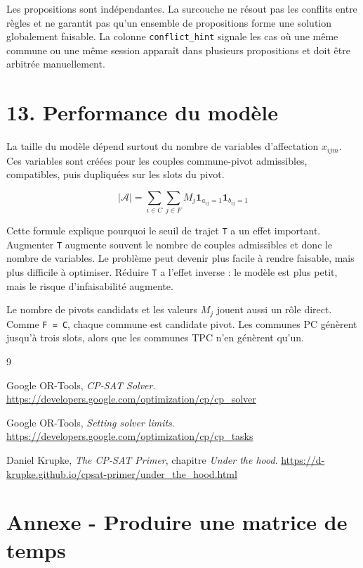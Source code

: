 \documentclass[11pt,a4paper]{article}
\begin{document}
Les propositions sont indépendantes. La surcouche ne résout pas les conflits entre règles et ne garantit pas qu'un ensemble de propositions forme une solution globalement faisable. La colonne \texttt{conflict\_hint} signale les cas où une même commune ou une même session apparaît dans plusieurs propositions et doit être arbitrée manuellement.


\section{13. Performance du modèle}

La taille du modèle dépend surtout du nombre de variables d'affectation $x_{ijm}$. Ces variables sont créées pour les couples commune-pivot admissibles, compatibles, puis dupliquées sur les slots du pivot.

\[
\left|\mathcal{A}\right|
=
\sum_{i\in C}
\sum_{j\in F}
M_j
\mathbf{1}_{a_{ij}=1}
\mathbf{1}_{b_{ij}=1}
\]

Cette formule explique pourquoi le seuil de trajet \texttt{T} a un effet important. Augmenter \texttt{T} augmente souvent le nombre de couples admissibles et donc le nombre de variables. Le problème peut devenir plus facile à rendre faisable, mais plus difficile à optimiser. Réduire \texttt{T} a l'effet inverse : le modèle est plus petit, mais le risque d'infaisabilité augmente.

Le nombre de pivots candidats et les valeurs $M_j$ jouent aussi un rôle direct. Comme \texttt{F = C}, chaque commune est candidate pivot. Les communes PC génèrent jusqu'à trois slots, alors que les communes TPC n'en génèrent qu'un.

\begin{thebibliography}{9}

Google OR-Tools, \emph{CP-SAT Solver}.
\url{https://developers.google.com/optimization/cp/cp_solver}

Google OR-Tools, \emph{Setting solver limits}.
\url{https://developers.google.com/optimization/cp/cp_tasks}

Daniel Krupke, \emph{The CP-SAT Primer}, chapitre \emph{Under the hood}.
\url{https://d-krupke.github.io/cpsat-primer/under_the_hood.html}

\end{thebibliography}

\newpage
\section{Annexe - Produire une matrice de temps}
\end{document}
